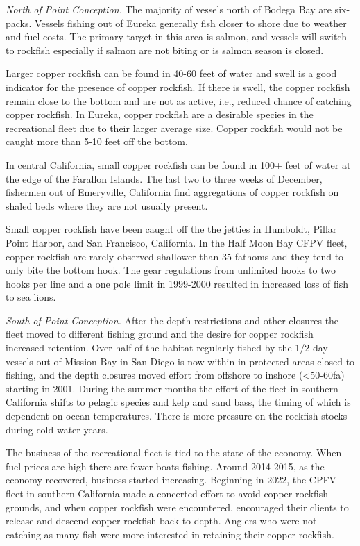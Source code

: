 \documentclass[11pt,
  letterpaper,
]{article}
\begin{document}
\emph{North of Point Conception.} The majority of vessels north of Bodega Bay are six-packs. Vessels fishing out of Eureka generally fish closer to shore due to weather and fuel costs. The primary target in this area is salmon, and vessels will switch to rockfish especially if salmon are not biting or is salmon season is closed.

Larger copper rockfish can be found in 40-60 feet of water and swell is a good indicator for the presence of copper rockfish. If there is swell, the copper rockfish remain close to the bottom and are not as active, i.e., reduced chance of catching copper rockfish. In Eureka, copper rockfish are a desirable species in the recreational fleet due to their larger average size. Copper rockfish would not be caught more than 5-10 feet off the bottom.

In central California, small copper rockfish can be found in 100+ feet of water at the edge of the Farallon Islands. The last two to three weeks of December, fishermen out of Emeryville, California find aggregations of copper rockfish on shaled beds where they are not usually present.

Small copper rockfish have been caught off the the jetties in Humboldt, Pillar Point Harbor, and San Francisco, California. In the Half Moon Bay CFPV fleet, copper rockfish are rarely observed shallower than 35 fathoms and they tend to only bite the bottom hook. The gear regulations from unlimited hooks to two hooks per line and a one pole limit in 1999-2000 resulted in increased loss of fish to sea lions.

\emph{South of Point Conception.} After the depth restrictions and other closures the fleet moved to different fishing ground and the desire for copper rockfish increased retention. Over half of the habitat regularly fished by the 1/2-day vessels out of Mission Bay in San Diego is now within in protected areas closed to fishing, and the depth closures moved effort from offshore to inshore (\textless50-60fa) starting in 2001. During the summer months the effort of the fleet in southern California shifts to pelagic species and kelp and sand bass, the timing of which is dependent on ocean temperatures. There is more pressure on the rockfish stocks during cold water years.

The business of the recreational fleet is tied to the state of the economy. When fuel prices are high there are fewer boats fishing. Around 2014-2015, as the economy recovered, business started increasing. Beginning in 2022, the CPFV fleet in southern California made a concerted effort to avoid copper rockfish grounds, and when copper rockfish were encountered, encouraged their clients to release and descend copper rockfish back to depth. Anglers who were not catching as many fish were more interested in retaining their copper rockfish.
\end{document}
